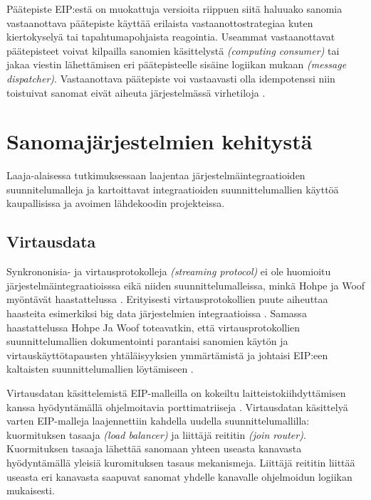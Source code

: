 \begin{itemize}
      Päätepiste EIP:estä on muokattuja versioita riippuen siitä haluuako sanomia vastaanottava päätepiste käyttää erilaista vastaanottostrategiaa kuten kiertokyselyä tai tapahtumapohjaista reagointia. Useammat vastaanottavat päätepisteet voivat kilpailla sanomien käsittelystä \textit{(computing consumer)} tai jakaa viestin lähettämisen eri päätepisteelle sisäine logiikan mukaan \textit{(message dispatcher)}. Vastaanottava päätepiste voi vastaavasti olla idempotenssi niin toistuivat sanomat eivät aiheuta järjestelmässä virhetiloja \citep[sivu~106]{Hohpe2004}.

\end{itemize}



\chapter{Sanomajärjestelmien kehitystä}

Laaja-alaisessa tutkimuksessaan \citep{Ritter2017} laajentaa järjestelmäintegraatioiden suunnitelumalleja ja kartoittavat integraatioiden suunnittelumallien käyttöä kaupallisissa ja avoimen lähdekoodin projekteissa.




\section{Virtausdata}
Synkrononisia- ja  virtausprotokolleja \textit{(streaming protocol)} ei  ole huomioitu järjestelmäintegraatioisssa eikä niiden suunnittelumalleissa, minkä Hohpe ja Woof myöntävät haastattelussa \citep{Zimmermann2016}. Erityisesti virtausprotokollien puute aiheuttaa haasteita esimerkiksi big data järjestelmien integraatioissa \citep{Ritter2017}.
Samassa haastattelussa Hohpe Ja Woof toteavatkin, että virtausprotokollien suunnittelumallien dokumentointi parantaisi sanomien käytön ja virtauskäyttötapausten yhtäläisyyksien ymmärtämistä ja johtaisi EIP:een kaltaisten suunnittelumallien löytämiseen \citep{Ritter2017}.

Virtausdatan käsittelemistä EIP-malleilla on kokeiltu laitteistokiihdyttämisen kanssa hyödyntämällä ohjelmoitavia porttimatriiseja \citep{DannRitter2017}. Virtausdatan käsittelyä varten EIP-malleja laajennettiin kahdella uudella suunnittelumallilla: kuormituksen tasaaja \textit{(load balancer)} ja liittäjä reititin \textit{(join router)}. Kuormituksen tasaaja lähettää sanomaan yhteen useasta kanavasta hyödyntämällä yleisiä kuromituksen tasaus mekanismeja. Liittäjä reititin liittää useasta eri kanavasta saapuvat sanomat yhdelle kanavalle ohjelmoidun logiikan mukaisesti.


